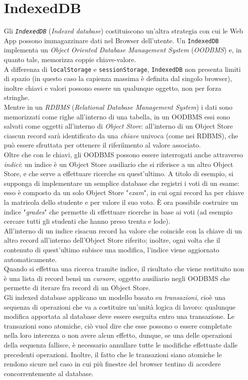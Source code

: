 \documentclass[a4paper, 12pt, twoside, openright]{book}
\begin{document}
\section{IndexedDB} 
Gli \textit{\texttt{IndexedDB}} (\textit{Indexed database}) costituiscono un'altra strategia con cui le Web App possono immagazzinare dati nel Browser dell'utente. Un \texttt{IndexedDB} implementa un \textit{Object Oriented Database Management System} (\textit{OODBMS}) e, in quanto tale, memorizza coppie chiave-valore.\\
A differenza di \texttt{localStorage} e \texttt{sessionStorage}, \texttt{IndexedDB} non presenta limiti di spazio (in questo caso la capienza massima è definita dal singolo browser), inoltre chiavi e valori possono essere un qualunque oggetto, non per forza stringhe.\\
Mentre in un \textit{RDBMS} (\textit{Relational Database Management System}) i dati sono memorizzati come righe all'interno di una tabella, in un OODBMS essi sono salvati come oggetti all'interno di \textit{Object Store}: all'interno di un Object Store ciascun record sarà identificato da una \textit{chiave} univoca (come nei RDBMS), che può essere sfruttata per ottenere il riferiìmento al valore associato.\\
Oltre che con le chiavi, gli OODBMS possono essere interrogati anche attraverso \textit{indici}: un indice è un Object Store ausiliario che si riferisce a un altro Object Store, e che serve a effettuare ricerche su quest'ultimo. A titolo di esempio, si supponga di implementare un semplice database che registri i voti di un esame: esso è composto da un solo Object Store "\textit{exam}", in cui ogni record ha per chiave la matricola dello studente e per valore il suo voto. È ora possibile costruire un indice "\textit{grades}" che permette di effettuare ricerche in base ai voti (ad esempio cercare tutti gli studenti che hanno preso trenta e lode).\\
All'interno di un indice cisacun record ha valore che coincide con la chiave di un altro record all'interno dell'Object Store riferito; inoltre, ogni volta che il contenuto di quest'ultimo subisce una modifica, l'indice viene aggiornato automaticamente.\\
Quando si effettua una ricerca tramite indice, il risultato che viene restituito non è una lista di record bensì un \textit{cursore}, oggetto ausiliario negli OODBMS che permette di iterare fra record di un Object Store.\\
Gli indexed database applicano un modello basato su \textit{transazioni}, cioè una sequenza di operazioni che va a costituire un'unità logica di lavoro: qualunque modifica apportata al database deve essere eseguita entro una transazione. Le transazioni sono atomiche, ciò vuol dire che esse possono o essere completate nella loro interezza o non avere alcun effetto, dunque, se una delle operazioni della sequenza fallisce, è necessario annullare tutte le modifiche effettuate dalle precedenti operazioni. Inoltre, il fatto che le transazioni siano atomiche le rendono sicure nel caso in cui più finestre del browser tentino di accedere concorrentemente al database.\\
\end{document}

